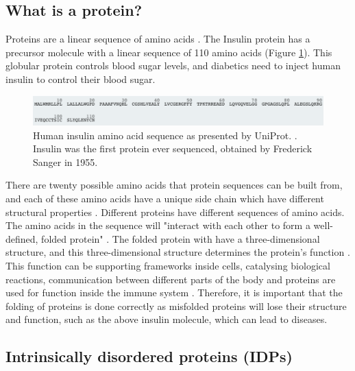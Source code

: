 \documentclass{l4proj}
\begin{document}
\subsection{What is a protein?}

Proteins are a linear sequence of amino acids \citep{prot_struct_lib}. The Insulin protein has a precursor molecule with a linear sequence of 110 amino acids (Figure \ref{fig:sequence example}). This globular protein controls blood sugar levels, and diabetics need to inject human insulin to control their blood sugar.

\begin{figure}[!h]
    \centering
    \includegraphics[width=\linewidth]{images/bgseq.pdf}

    \caption{Human insulin amino acid sequence as presented by UniProt. \citep{uniprot:22}. Insulin was the first protein ever sequenced, obtained by Frederick Sanger in 1955.}

    \label{fig:sequence example} 
\end{figure}

There are twenty possible amino acids that protein sequences can be built from, and each of these amino acids have a unique side chain which have different structural properties \citep{aa_wiki}. Different proteins have different sequences of amino acids. The amino acids in the sequence will "interact with each other to form a well-defined, folded protein" \citep{protein_folding}. The folded protein with have a three-dimensional structure, and this three-dimensional structure determines the protein's function \citep{bbc_bitesize}. This function can be supporting frameworks inside cells, catalysing biological reactions, communication between different parts of the body and proteins are used for function inside the immune system \citep{bbc_bitesize}. Therefore, it is important that the folding of proteins is done correctly as misfolded proteins will lose their structure and function, such as the above insulin molecule, which can lead to diseases.

\subsection{Intrinsically disordered proteins (IDPs)}
\label{chap:background sec:IDPs}
\end{document}
